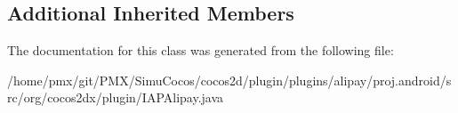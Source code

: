 \subsection*{Additional Inherited Members}


The documentation for this class was generated from the following file\+:\begin{DoxyCompactItemize}
\item 
/home/pmx/git/\+P\+M\+X/\+Simu\+Cocos/cocos2d/plugin/plugins/alipay/proj.\+android/src/org/cocos2dx/plugin/I\+A\+P\+Alipay.\+java\end{DoxyCompactItemize}
